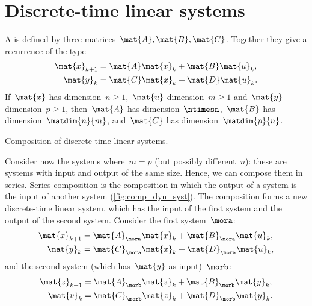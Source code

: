 
\section{Discrete-time linear systems}

\begin{definition}
    \label{def:discrete-time-linear-system}
    A  is defined by three matrices~$\mat{A},\mat{B},\mat{C}$.
    Together they give a recurrence of the type
    \begin{equation}
        \label{eq:discrete-time-dynamics}
        \begin{aligned}
            \mat{x}_{k+1} & =  \mat{A} \mat{x}_k + \mat{B} \mat{u}_k, \\
            \mat{y}_{k}   & =  \mat{C} \mat{x}_k + \mat{D} \mat{u}_k.
        \end{aligned}
    \end{equation}
    If~$\mat{x}$ has dimension~$n\geq1$,~$\mat{u}$ dimension~$m\geq1$ and~$\mat{y}$ dimension~$p\geq1$, then~$\mat{A}$ has dimension~$\ntimesn$,~$\mat{B}$ has dimension~$\matdim{n}{m}$, and~$\mat{C}$ has dimension~$\matdim{p}{n}$.
\end{definition}

\begin{marginfigure}
    \centering
    \caption{Composition of discrete-time linear systems.}
    \label{fig:comp_dyn_syst}
\end{marginfigure}

Consider now the systems where~$m=p$ (but possibly different~$n$):
these are systems with input and output of the same size.
Hence, we can compose them in series.
Series composition is the composition in which the output of a system is the input of another system (\cref{fig:comp_dyn_syst}).
The composition forms a new discrete-time linear system, which has the input of the first system and the output of the second system.
Consider the first system~$\mora$:
%
\begin{equation}
    \label{eq:dlin-1}
    \begin{aligned}
        \mat{x}_{k+1} & = \mat{A}_\mora \mat{x}_k + \mat{B}_\mora \mat{u}_k, \\
        \mat{y}_{k}   & = \mat{C}_\mora \mat{x}_k + \mat{D}_\mora \mat{u}_k,
    \end{aligned}
\end{equation}
%
and the second system (which has~$\mat{y}$ as input)~$\morb$:
%
\begin{equation}
    \label{eq:dlin-2}
    \begin{aligned}
        \mat{z}_{k+1} & = \mat{A}_\morb \mat{z}_k + \mat{B}_\morb \mat{y}_k, \\
        \mat{v}_{k}   & = \mat{C}_\morb \mat{z}_k+ \mat{D}_\morb \mat{y}_k.
    \end{aligned}
\end{equation}

